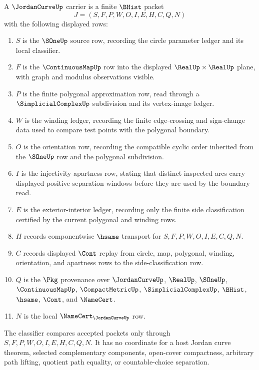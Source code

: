 \begin{definition}
\label{def:jordan-curve-carrier}
A $\JordanCurveUp$ carrier is a finite $\BHist$ packet
$$
J=(S,F,P,W,O,I,E,H,C,Q,N)
$$
with the following displayed rows:
\begin{enumerate}
\item $S$ is the $\SOneUp$ source row, recording the circle parameter ledger and its local classifier.
\item $F$ is the $\ContinuousMapUp$ row into the displayed $\RealUp\times\RealUp$ plane, with graph and modulus observations visible.
\item $P$ is the finite polygonal approximation row, read through a $\SimplicialComplexUp$ subdivision and its vertex-image ledger.
\item $W$ is the winding ledger, recording the finite edge-crossing and sign-change data used to compare test points with the polygonal boundary.
\item $O$ is the orientation row, recording the compatible cyclic order inherited from the $\SOneUp$ row and the polygonal subdivision.
\item $I$ is the injectivity-apartness row, stating that distinct inspected arcs carry displayed positive separation windows before they are used by the boundary read.
\item $E$ is the exterior-interior ledger, recording only the finite side classification certified by the current polygonal and winding rows.
\item $H$ records componentwise $\hsame$ transport for $S,F,P,W,O,I,E,C,Q,N$.
\item $C$ records displayed $\Cont$ replay from circle, map, polygonal, winding, orientation, and apartness rows to the side-classification row.
\item $Q$ is the $\Pkg$ provenance over $\JordanCurveUp$, $\RealUp$, $\SOneUp$, $\ContinuousMapUp$, $\CompactMetricUp$, $\SimplicialComplexUp$, $\BHist$, $\hsame$, $\Cont$, and $\NameCert$.
\item $N$ is the local $\NameCert_{\JordanCurveUp}$ row.
\end{enumerate}
The classifier compares accepted packets only through $S,F,P,W,O,I,E,H,C,Q,N$. It has no coordinate for a host Jordan curve theorem, selected complementary components, open-cover compactness, arbitrary path lifting, quotient path equality, or countable-choice separation.
\end{definition}

